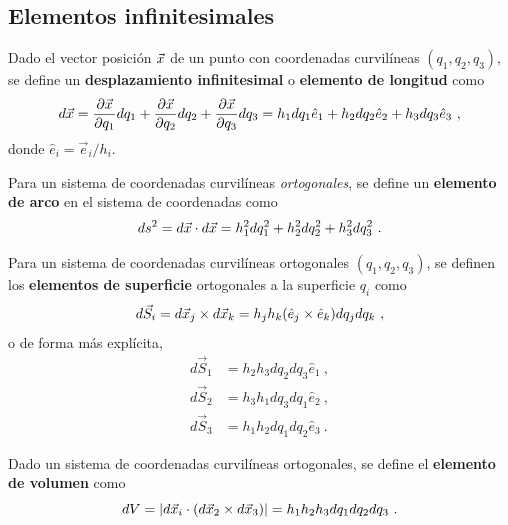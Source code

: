 \newpage

\subsection{Elementos infinitesimales}

\begin{defi}
    Dado el vector posición $\vec{x}$ de un punto con coordenadas curvilíneas $(q_1, q_2, q_3)$, se define un \textbf{desplazamiento infinitesimal} o \textbf{elemento de longitud} como 
    \begin{equation}
        d\vec{x} = \frac{\partial \vec{x}}{\partial q_1} dq_1 + \frac{\partial \vec{x}}{\partial q_2} dq_2 + \frac{\partial \vec{x}}{\partial q_3} dq_3 = h_1 dq_1 \hat{e}_1 + h_2 dq_2 \hat{e}_2 + h_3 dq_3 \hat{e}_3 \ ,
    \end{equation}
    donde $\hat{e}_i = \vec{e}_i / h_i$.
\end{defi}

\begin{defi}
    Para un sistema de coordenadas curvilíneas \emph{ortogonales}, se define un \textbf{elemento de arco} en el sistema de coordenadas como 
    \begin{equation}
        ds^2 = d\vec{x} \cdot d\vec{x} = h_1^2 dq_1^2 + h_2^2 dq_2^2 + h_3^2 dq_3^2 \ .
    \end{equation}
\end{defi}

\begin{defi}
    Para un sistema de coordenadas curvilíneas ortogonales $(q_1, q_2, q_3)$, se definen los \textbf{elementos de superficie} ortogonales a la superficie $q_i$ como 
    \begin{equation}
        d\vec{S}_i = d\vec{x}_j \times d\vec{x}_k = h_j h_k (\hat{e}_j \times \hat{e}_k) dq_j dq_k \ ,
    \end{equation}
    o de forma más explícita, 
    \begin{align*}
        d\vec{S}_1 & = h_2 h_3 dq_2 dq_3 \hat{e}_1 \ , \\
        d\vec{S}_2 & = h_3 h_1 dq_3 dq_1 \hat{e}_2 \ , \\
        d\vec{S}_3 & = h_1 h_2 dq_1 dq_2 \hat{e}_3 \ .
    \end{align*}
\end{defi}

\begin{defi}
    Dado un sistema de coordenadas curvilíneas ortogonales, se define el \textbf{elemento de volumen} como 
    \begin{equation}
        dV = \left| d\vec{x}_i \cdot (d\vec{x}_2 \times d\vec{x}_3) \right| = h_1 h_2 h_3 dq_1 dq_2 dq_3 \ .
    \end{equation}
\end{defi}

